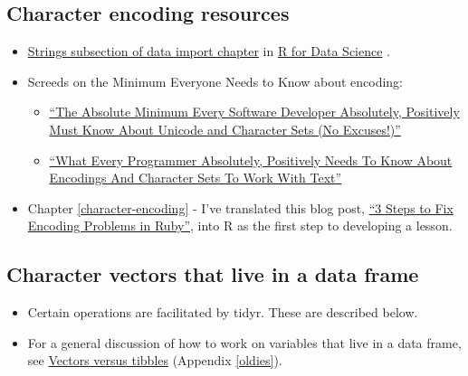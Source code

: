 \documentclass[
]{book}
\providecommand{\tightlist}{%
  \setlength{\itemsep}{0pt}\setlength{\parskip}{0pt}}
\begin{document}
\hypertarget{character-encoding-resources}{%
\subsection{Character encoding resources}\label{character-encoding-resources}}

\begin{itemize}
\tightlist
\item
  \href{https://r4ds.had.co.nz/data-import.html\#readr-strings}{Strings subsection of data import chapter} in \href{https://r4ds.had.co.nz}{R for Data Science} \citep{wickham2016}.
\item
  Screeds on the Minimum Everyone Needs to Know about encoding:

  \begin{itemize}
  \tightlist
  \item
    \href{https://www.joelonsoftware.com/2003/10/08/the-absolute-minimum-every-software-developer-absolutely-positively-must-know-about-unicode-and-character-sets-no-excuses/}{``The Absolute Minimum Every Software Developer Absolutely, Positively Must Know About Unicode and Character Sets (No Excuses!)''}
  \item
    \href{http://kunststube.net/encoding/}{``What Every Programmer Absolutely, Positively Needs To Know About Encodings And Character Sets To Work With Text''}
  \end{itemize}
\item
  Chapter \ref{character-encoding} - I've translated this blog post, \href{https://www.justinweiss.com/articles/3-steps-to-fix-encoding-problems-in-ruby/}{``3 Steps to Fix Encoding Problems in Ruby''}, into R as the first step to developing a lesson.
\end{itemize}

\hypertarget{character-vectors-that-live-in-a-data-frame}{%
\subsection{Character vectors that live in a data frame}\label{character-vectors-that-live-in-a-data-frame}}

\begin{itemize}
\tightlist
\item
  Certain operations are facilitated by tidyr. These are described below.
\item
  For a general discussion of how to work on variables that live in a data frame, see \protect\hyperlink{oldies}{Vectors versus tibbles} (Appendix \ref{oldies}).
\end{itemize}
\end{document}
